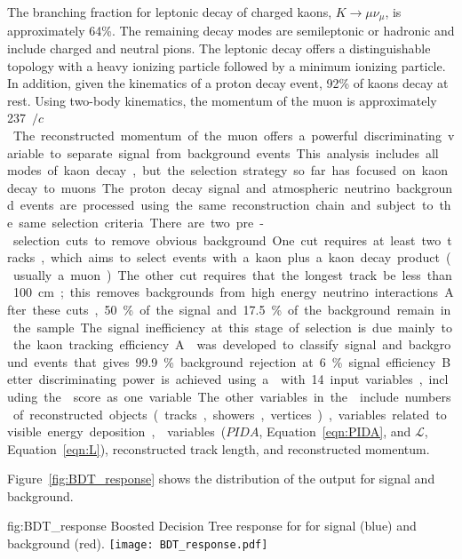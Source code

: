 The branching fraction for leptonic decay of charged kaons, $K\rightarrow \mu \nu_{\mu}$, is approximately \num{64}\%. The remaining decay modes are semileptonic or hadronic and include charged and neutral pions. The leptonic decay offers a distinguishable topology with a heavy ionizing particle followed by a minimum ionizing particle. In addition, given the kinematics of a proton decay event, \num{92}\% of kaons decay at rest. Using two-body kinematics, the momentum of the muon is approximately \SI{237}{\MeV$/c$}. The reconstructed momentum of the muon offers a powerful discriminating variable to separate signal from background events.  This analysis includes all modes of kaon decay, but the selection strategy so far has focused on kaon decay to muons.

The proton decay signal and atmospheric neutrino background events are processed using the same reconstruction chain and subject to the same selection criteria. There are two pre-selection cuts to remove obvious background. One cut requires at least two tracks, which aims to select events with a kaon plus a kaon decay product (usually a muon).  The other cut requires that the longest track be less than \SI{100}{\cm}; this removes backgrounds from high energy neutrino interactions.  After these cuts, \num{50}\% of the signal and \num{17.5}\% of the background remain in the sample.  The signal inefficiency at this stage of selection is due mainly to the kaon tracking efficiency.

A  was developed to classify signal and background events that gives \num{99.9}\% background rejection at \num{6}\% signal efficiency.  Better discriminating power is achieved using a  with \num{14} input variables, including the  score as one  variable.  The other variables in the  include numbers of reconstructed objects (tracks, showers, vertices), variables related to visible energy deposition,  variables ($PIDA$, Equation~\ref{eqn:PIDA}, and $\mathcal{L}$, Equation~\ref{eqn:L}), reconstructed track length, and reconstructed momentum.

Figure~\ref{fig:BDT_response} shows the distribution of the  output for signal and background.

\begin{dunefigure}
{fig:BDT_response}
{Boosted Decision Tree response for \ptoknubar for signal (blue) and background (red).}
\texttt{[image: BDT\_response.pdf]}
\end{dunefigure} 

